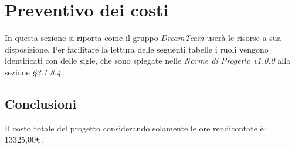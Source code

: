 \section{Preventivo dei costi}
In questa sezione si riporta come il gruppo \textit{DreamTeam} userà le risorse a sua disposizione. Per facilitare la lettura delle seguenti tabelle i ruoli vengono identificati con delle sigle, che sono spiegate nelle \textit{Norme di Progetto v1.0.0} alla sezione \textit{§3.1.8.4}.


\pagebreak

\pagebreak

\pagebreak

\pagebreak


\subsection{Conclusioni}
Il costo totale del progetto considerando solamente le ore rendicontate è: 13325,00\euro .

\pagebreak
